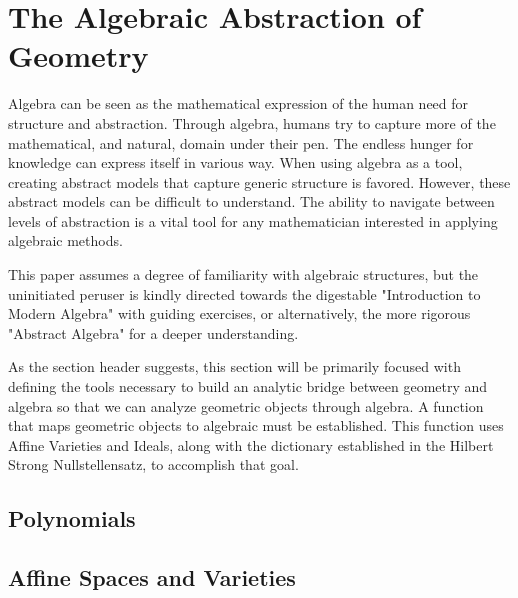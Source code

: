 \clearpage{\thispagestyle{empty}}
\section{The Algebraic Abstraction of Geometry}
\label{sec:algebraic-abstraction}
Algebra can be seen as the mathematical expression of the human need for structure and abstraction. Through algebra, humans try to capture more of the mathematical, and natural, domain under their pen. The endless hunger for knowledge can express itself in various way. When using algebra as a tool, creating abstract models that capture generic structure is favored. However, these abstract models can be difficult to understand. The ability to navigate between levels of abstraction is a vital tool for any mathematician interested in applying algebraic methods. 

This paper assumes a degree of familiarity with algebraic structures, but the uninitiated peruser is kindly directed towards the digestable "Introduction to Modern Algebra" \cite{weiner1970introduction} with guiding exercises, or alternatively, the more rigorous "Abstract Algebra" \cite{dummit2003abstract} for a deeper understanding. 

As the section header suggests, this section will be primarily focused with defining the tools necessary to build an analytic bridge between geometry and algebra so that we can analyze geometric objects through algebra. A function that maps geometric objects to algebraic must be established. This function uses Affine Varieties and Ideals, along with the dictionary established in the Hilbert Strong Nullstellensatz, to accomplish that goal.

% 

\subsection{Polynomials}
\label{ssec:polynomials}


\subsection{Affine Spaces and Varieties }
\label{ssec:affine-spaces-and-varieties}


% 